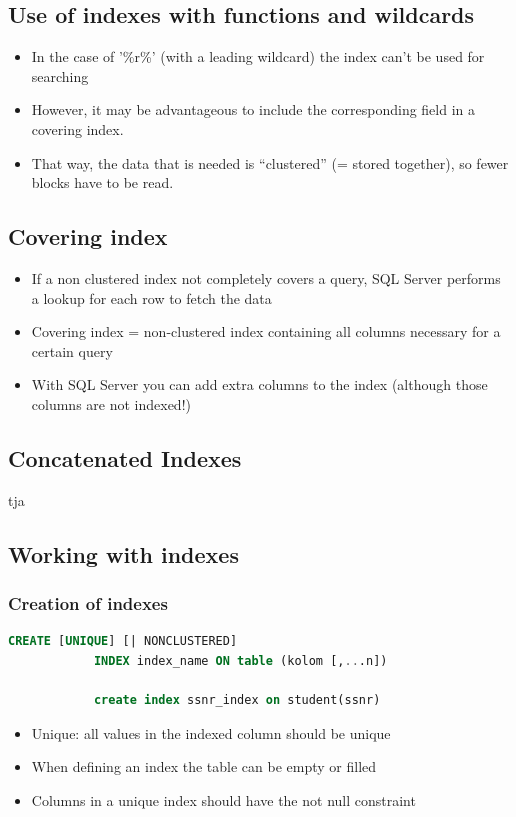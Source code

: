 \documentclass{report}
\begin{document}
    \subsection{Use of indexes with functions and wildcards}
        \begin{itemize} 
            \item In the case of '\%r\%' (with a leading wildcard) the index can't be used for searching
            \item However, it may be advantageous to include the corresponding field in a covering index.
            \item That way, the data that is needed is “clustered” (= stored together), so fewer blocks have to be read.
        \end{itemize}
    \subsection{Covering index}
        \begin{itemize}
            \item If a non clustered index not completely covers a query, SQL Server performs a lookup for each row to fetch the data
            \item Covering index = non-clustered index containing all columns necessary for a certain query
            \item With SQL Server you can add extra columns to the index (although those columns are not indexed!)
        \end{itemize}
    \subsection{Concatenated Indexes}
        tja
    \subsection{Working with indexes}
        \subsubsection{Creation of indexes}
        \begin{lstlisting}[language=SQL]
            CREATE [UNIQUE] [| NONCLUSTERED]
            INDEX index_name ON table (kolom [,...n])
            
            create index ssnr_index on student(ssnr)
        \end{lstlisting}
        \begin{itemize}
            \item Unique: all values in the indexed column should be unique
            \item When defining an index the table can be empty or filled
            \item Columns in a unique index should have the not null constraint
        \end{itemize}
\end{document}
